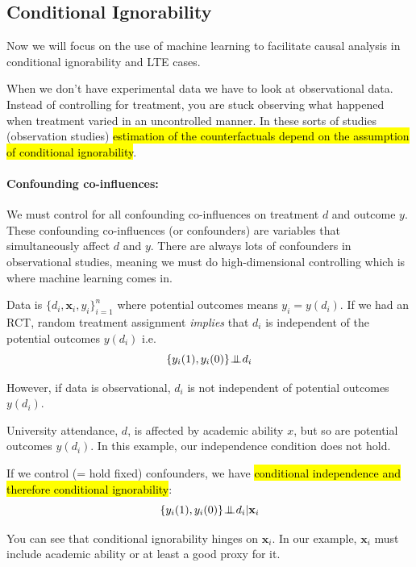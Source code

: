 \documentclass[11pt]{article}
\begin{document}
\subsection{Conditional Ignorability}

Now we will focus on the use of machine learning to facilitate causal analysis in conditional ignorability and LTE cases.

When we don't have experimental data we have to look at observational data. Instead of controlling for treatment, you are stuck observing what happened when treatment varied in an uncontrolled manner. In these sorts of studies (observation studies) \hl{estimation of the counterfactuals depend on the assumption of conditional ignorability}.

\paragraph{Confounding co-influences:} We must control for all confounding co-influences on treatment $d$ and outcome $y$. These confounding co-influences (or confounders) are variables that simultaneously affect $d$ and $y$. There are always lots of confounders in observational studies, meaning we must do high-dimensional controlling which is where machine learning comes in.

\begin{procedure}
    \hspace{1in}
    Data is $\{d_i, \mathbf{x}_i, y_i\}_{i=1}^n$ where potential outcomes means $y_i = y(d_i)$. If we had an RCT, random treatment assignment \textit{implies} that $d_i$ is independent of the potential outcomes $y(d_i)$ i.e.
    \begin{equation*}
        \{y_i(1), y_i(0)\} \perp\!\!\!\!\!\!\perp d_i
    \end{equation*}

    However, if data is observational, $d_i$ is not independent of potential outcomes $y(d_i)$.
    \begin{example}
        University attendance, $d$, is affected by academic ability $x$, but so are potential outcomes $y(d_i)$. In this example, our independence condition does not hold.
    \end{example}

    If we control (= hold fixed) confounders, we have \hl{conditional independence and therefore conditional ignorability}:
    \begin{equation*}
        \{y_i(1), y_i(0)\} \perp\!\!\!\!\!\!\perp d_i |\mathbf{x}_i
    \end{equation*}

    You can see that conditional ignorability hinges on $\mathbf{x}_i$. In our example, $\mathbf{x}_i$ must include academic ability or at least a good proxy for it.
\end{procedure}
\end{document}
